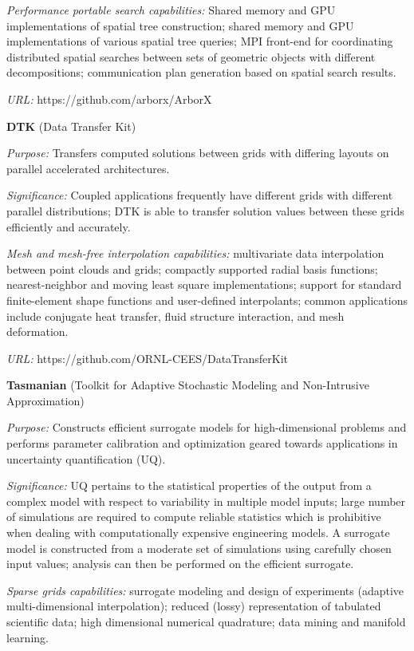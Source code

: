 {\it Performance portable search capabilities:} Shared memory and GPU
implementations of spatial tree construction; shared memory and GPU
implementations of various spatial tree queries; MPI front-end for
coordinating distributed spatial searches between sets of geometric objects
with different decompositions; communication plan generation based on spatial
search results.

{\it URL:} https://github.com/arborx/ArborX

{\bf DTK} (Data Transfer Kit)

{\it Purpose:} Transfers computed solutions between grids with differing
layouts on parallel accelerated architectures.

{\it Significance:} Coupled applications frequently have different grids with
different parallel distributions; DTK is able to transfer solution values
between these grids efficiently and accurately.

{\it Mesh and mesh-free interpolation capabilities:} multivariate data
interpolation between point clouds and grids; compactly supported radial basis
functions; nearest-neighbor and moving least square implementations; support
for standard finite-element shape functions and user-defined interpolants;
common applications include conjugate heat transfer, fluid structure
interaction, and mesh deformation.

{\it URL:} https://github.com/ORNL-CEES/DataTransferKit


{\bf Tasmanian} (Toolkit for Adaptive Stochastic Modeling and Non-Intrusive
Approximation)

{\it Purpose:} Constructs efficient surrogate models for high-dimensional
problems and performs parameter calibration and optimization geared towards
applications in uncertainty quantification (UQ).

{\it Significance:} UQ pertains to the statistical properties of the output
from a complex model with respect to variability in multiple model inputs;
large number of simulations are required to compute reliable statistics which
is prohibitive when dealing with computationally expensive engineering
models. A surrogate model is constructed from a moderate set of simulations
using carefully chosen input values; analysis can then be performed on the
efficient surrogate.

{\it Sparse grids capabilities:} surrogate modeling and design of experiments
(adaptive multi-dimensional interpolation); reduced (lossy) representation of
tabulated scientific data; high dimensional numerical quadrature; data mining
and manifold learning.

